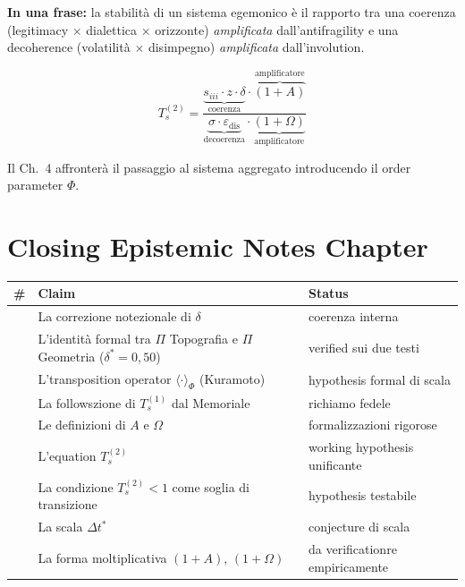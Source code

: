 \Proved{} \textbf{In una frase:} la stabilità di un sistema egemonico è
il rapporto tra una coerenza (legitimacy $\times$ dialettica $\times$ orizzonte)
\emph{amplificata} dall'antifragility e una decoherence (volatilità $\times$
disimpegno) \emph{amplificata} dall'involution.

\[
T_s^{(2)} = \frac{\underbrace{s_{iii} \cdot z \cdot \delta}_{\text{coerenza}} \cdot \overbrace{(1+A)}^{\text{amplificatore}}}{\underbrace{\sigma \cdot \varepsilon_{\text{dis}}}_{\text{decoerenza}} \cdot \underbrace{(1+\Omega)}_{\text{amplificatore}}}
\]

Il Ch.~4 affronterà il passaggio al sistema aggregato introducendo il
order parameter \(\Phi\).



\section{Closing Epistemic Notes
Chapter}\label{note-epistemiche-di-chiusura-chapter}

{\def\LTcaptype{none} %
{\small\begin{longtable}[]{@{}
  >{\raggedright\arraybackslash}p{}
  >{\raggedright\arraybackslash}p{}
  >{\raggedright\arraybackslash}p{}@{}}
\toprule\noalign{}
\begin{minipage}[b]{\linewidth}\raggedright
\#
\end{minipage} & \begin{minipage}[b]{\linewidth}\raggedright
Claim
\end{minipage} & \begin{minipage}[b]{\linewidth}\raggedright
Status
\end{minipage} \\
\midrule\noalign{}
\endhead
\bottomrule\noalign{}
\endlastfoot
1 & La correzione notezionale di \(\delta\) & \Proved{} coerenza
interna \\
2 & L'identità formal tra \(\Pi\) Topografia e \(\Pi\) Geometria
(\(\delta^*=0{,}50\)) & \Proved{} verified sui due testi \\
3 & L'transposition operator \(\langle\cdot\rangle_\Phi\) (Kuramoto)
& \Hypoth{} hypothesis formal di scala \\
4 & La followszione di \(T_s^{(1)}\) dal Memoriale & \Proved{} richiamo
fedele \\
5 & Le definizioni di \(A\) e \(\Omega\) & \Proved{} formalizzazioni
rigorose \\
6 & L'equation \(T_s^{(2)}\) & \Hypoth{} working hypothesis
unificante \\
7 & La condizione \(T_s^{(2)} < 1\) come soglia di transizione &
\Hypoth{} hypothesis testabile \\
8 & La scala \(\Delta t^*\) & \Conj{} conjecture di scala \\
9 & La forma moltiplicativa \((1+A)\), \((1+\Omega)\) & \ToVerify{} da
verificationre empiricamente \\
\end{longtable}}
}


